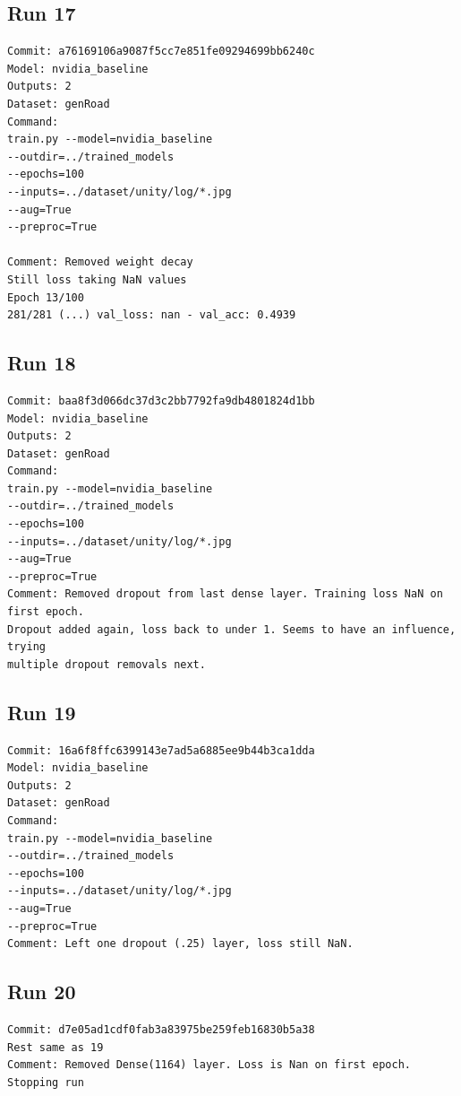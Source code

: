 \subsection{Run 17}

\begin{verbatim}
Commit: a76169106a9087f5cc7e851fe09294699bb6240c 
Model: nvidia_baseline
Outputs: 2
Dataset: genRoad
Command: 
train.py --model=nvidia_baseline
--outdir=../trained_models
--epochs=100
--inputs=../dataset/unity/log/*.jpg
--aug=True
--preproc=True

Comment: Removed weight decay
Still loss taking NaN values
Epoch 13/100
281/281 (...) val_loss: nan - val_acc: 0.4939

\end{verbatim}

\subsection{Run 18 }

\begin{verbatim}
Commit: baa8f3d066dc37d3c2bb7792fa9db4801824d1bb 
Model: nvidia_baseline
Outputs: 2
Dataset: genRoad
Command: 
train.py --model=nvidia_baseline
--outdir=../trained_models
--epochs=100
--inputs=../dataset/unity/log/*.jpg
--aug=True
--preproc=True
Comment: Removed dropout from last dense layer. Training loss NaN on first epoch.
Dropout added again, loss back to under 1. Seems to have an influence, trying
multiple dropout removals next.

\end{verbatim}



\subsection{Run 19}
\begin{verbatim}
Commit: 16a6f8ffc6399143e7ad5a6885ee9b44b3ca1dda
Model: nvidia_baseline
Outputs: 2
Dataset: genRoad
Command: 
train.py --model=nvidia_baseline
--outdir=../trained_models
--epochs=100
--inputs=../dataset/unity/log/*.jpg
--aug=True
--preproc=True
Comment: Left one dropout (.25) layer, loss still NaN.
\end{verbatim}

\subsection{Run 20}

\begin{verbatim}
Commit: d7e05ad1cdf0fab3a83975be259feb16830b5a38
Rest same as 19
Comment: Removed Dense(1164) layer. Loss is Nan on first epoch.
Stopping run

\end{verbatim}

